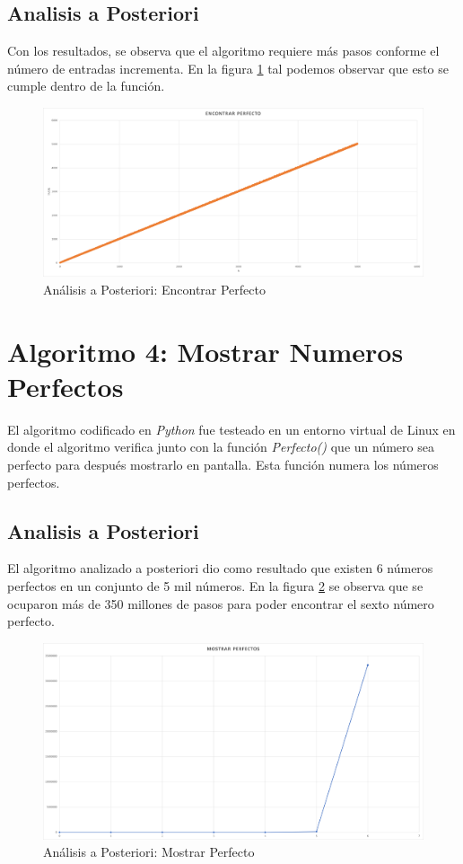     \newpage   
    \subsection{Analisis a Posteriori}
        Con los resultados, se observa que el algoritmo requiere más pasos conforme el número de entradas incrementa. En la figura \ref{fig:perfecto_post_1} tal podemos observar que esto se cumple dentro de la función.
        
        \begin{figure}[htp!]
            \centering
            \includegraphics[width=0.8 \textwidth]{Images/posteriori_perfecto.png}
            \caption{Análisis a Posteriori: Encontrar Perfecto}
            \label{fig:perfecto_post_1}
        \end{figure}

\newpage
    \section{Algoritmo 4: Mostrar Numeros Perfectos}
        El algoritmo codificado en \textit{Python} fue testeado en un entorno virtual de Linux en donde el algoritmo verifica junto con la función \textit{Perfecto()} que un número sea perfecto para después mostrarlo en pantalla. Esta función numera los números perfectos. 
        
    \subsection{Analisis a Posteriori}
        El algoritmo analizado a posteriori dio como resultado que existen 6 números perfectos en un conjunto de 5 mil números. En la figura \ref{fig:perfecto_post_2} se observa que se ocuparon más de 350 millones de pasos para poder encontrar el sexto número perfecto. 
        
        \begin{figure}[htp!]
            \centering
            \includegraphics[width=0.8 \textwidth]{Images/posteriori_perfecto_m.png}
            \caption{Análisis a Posteriori: Mostrar Perfecto}
            \label{fig:perfecto_post_2}
        \end{figure}
        
        
    
